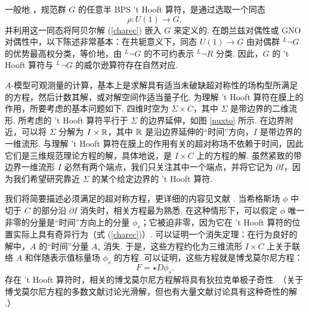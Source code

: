 一般地 \cite{Kapustintwo}，规范群 $G$ 的任意半 BPS 't Hooft 算符，是通过选取一个同态
\begin{equation}\label{pickhom}\rho:U(1)\to G, \end{equation}
并利用这一同态将阿贝尔解 (\ref{charec}) 嵌入 $G$ 来定义的.
在朗兰兹对偶性或 GNO 对偶性中，以下陈述非常基本：在共轭意义下，同态 $U(1)\to G$ 由对偶群 $^L\neg G$ 的优势最高权分类，等价地，由 $^L\neg G$ 的不可约表示 $^L\neg R$ 分类. 因此，$G$ 的 't Hooft 算符与 $^L\neg G$ 的威尔逊算符存在自然对应.

$A$-模型可观测量的计算，基本上是求解具有适当未破缺超对称性的场构型所满足的方程，然后计数其解，或对解空间作适当量子化. 为理解 't Hooft 算符在膜上的作用，所要考虑的基本问题如下. 四维时空为 $\Sigma\times C$，其中 $\Sigma$ 是带边界的二维流形.
所考虑的 't Hooft 算符平行于 $\Sigma$ 的边界延伸，如图 \ref{nuxto} 所示. 在边界附近，可以将 $\Sigma$ 分解为 $I\times {\mathbb R}$，其中 ${\mathbb R}$ 是沿边界延伸的“时间”方向，$I$ 是带边界的一维流形. 与理解 't Hooft 算符在膜上的作用有关的超对称场不依赖于时间，因此它们是三维规范理论方程的解，具体地说，是 $I\times C$ 上的方程的解. 虽然紧致的带边界一维流形 $I$ 必然有两个端点，我们只关注其中一个端点，并将它记为 $\partial I$，因为我们希望研究靠近 $\Sigma$ 的某个给定边界的 't Hooft 算符.

我们将简要描述必须满足的超对称方程，更详细的内容见文献 \cite{KW}.
当希格斯场 $\phi$ 中切于 $C$ 的部分沿 $\partial I$ 消失时，相关方程最为熟悉. 在这种情形下，可以假定 $\phi$ 唯一非零的分量是“时间”方向上的分量 $\phi_s$；它被迫非零，因为它在 't Hooft 算符的位置实际上具有奇异行为（式 (\ref{charec})）. 可以证明一个消失定理：在行为良好的解中，$A$ 的“时间”分量 $A_s$ 消失.
于是，这些方程约化为三维流形 $I\times C$ 上关于联络 $A$ 和伴随表示值标量场 $\phi_s$ 的方程.
可以证明，这些方程就是博戈莫尔尼方程：
\begin{equation}\label{zoddo} F=\star D\phi_s. \end{equation}
存在 't Hooft 算符时，相关的博戈莫尔尼方程解将具有狄拉克单极子奇性.
（关于博戈莫尔尼方程的多数文献讨论光滑解，但也有大量文献讨论具有这种奇性的解 \cite{kronheimermon,polo,golo,golo2,latwein,bais,hanwit,cherkis}.）

